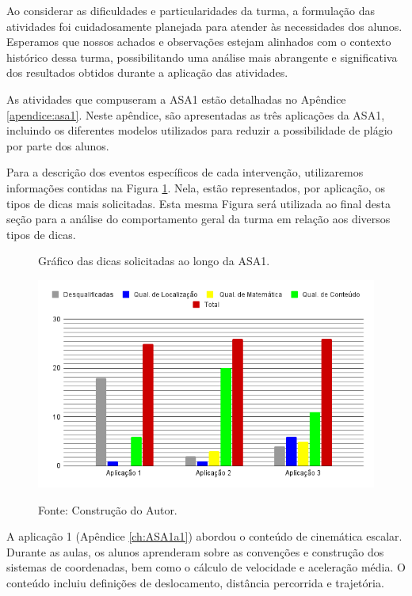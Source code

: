 Ao considerar as dificuldades e particularidades da turma, a formulação das atividades foi cuidadosamente planejada para atender às necessidades dos alunos. Esperamos que nossos achados e observações estejam alinhados com o contexto histórico dessa turma, possibilitando uma análise mais abrangente e significativa dos resultados obtidos durante a aplicação das atividades. 

As atividades que compuseram a ASA1 estão detalhadas no Apêndice \ref{apendice:asa1}. Neste apêndice, são apresentadas as três aplicações da ASA1, incluindo os diferentes modelos utilizados para reduzir a possibilidade de plágio por parte dos alunos.

Para a descrição dos eventos específicos de cada intervenção, utilizaremos informações contidas na Figura \ref{fig:dicasASA1}. Nela, estão representados, por aplicação, os tipos de dicas mais solicitadas. Esta mesma Figura será utilizada ao final desta seção para a análise do comportamento geral da turma em relação aos diversos tipos de dicas.

\begin{figure}[ht]
\begin{center}
\caption{Gráfico das dicas solicitadas ao longo da ASA1.}
\includegraphics[width=1\textwidth]{fig/graficoDicasASA1.png}
\label{fig:dicasASA1}
\caption*{Fonte: Construção do Autor.}
\end{center}
\end{figure}

A  aplicação 1 (Apêndice \ref{ch:ASA1a1}) abordou o conteúdo de cinemática escalar. Durante as aulas, os alunos aprenderam sobre as convenções e construção dos sistemas de coordenadas, bem como o cálculo de velocidade e aceleração média. O conteúdo incluiu definições de deslocamento, distância percorrida e trajetória.

